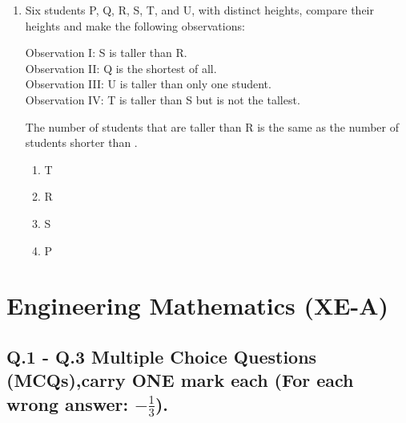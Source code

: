 \documentclass[journal,12pt,onecolumn]{IEEEtran}
\theoremstyle{remark}
\begin{document}
\begin{enumerate}
    \item Six students P, Q, R, S, T, and U, with distinct heights, compare their heights and make the following observations:
    
    Observation I: S is taller than R. \\
    Observation II: Q is the shortest of all. \\
    Observation III: U is taller than only one student. \\
    Observation IV: T is taller than S but is not the tallest.
    
    The number of students that are taller than R is the same as the number of students shorter than {\underline{\hspace{2cm}}}.
    \begin{enumerate}
        \item T
        \item R
        \item S
        \item P
    \end{enumerate}
\end{enumerate}
\section*{Engineering Mathematics (XE-A)}

\subsection*{Q.1 - Q.3 Multiple Choice Questions (MCQs),carry \textbf{ONE} mark each (For each wrong answer: $-\frac{1}{3}$).
}
\end{document}
